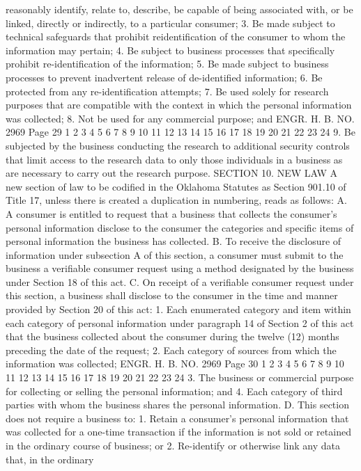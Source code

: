 reasonably identify, relate to, describe, be capable of being
associated with, or be linked, directly or indirectly, to a
particular consumer;
3. Be made subject to technical safeguards that prohibit reidentification of the consumer to whom the information may pertain;
4. Be subject to business processes that specifically prohibit
re-identification of the information;
5. Be made subject to business processes to prevent inadvertent
release of de-identified information;
6. Be protected from any re-identification attempts;
7. Be used solely for research purposes that are compatible
with the context in which the personal information was collected;
8. Not be used for any commercial purpose; and
ENGR. H. B. NO. 2969 Page 29
1
2
3
4
5
6
7
8
9
10
11
12
13
14
15
16
17
18
19
20
21
22
23
24
9. Be subjected by the business conducting the research to
additional security controls that limit access to the research data
to only those individuals in a business as are necessary to carry
out the research purpose.
SECTION 10. NEW LAW A new section of law to be codified
in the Oklahoma Statutes as Section 901.10 of Title 17, unless there
is created a duplication in numbering, reads as follows:
A. A consumer is entitled to request that a business that
collects the consumer's personal information disclose to the
consumer the categories and specific items of personal information
the business has collected.
B. To receive the disclosure of information under subsection A
of this section, a consumer must submit to the business a verifiable
consumer request using a method designated by the business under
Section 18 of this act.
C. On receipt of a verifiable consumer request under this
section, a business shall disclose to the consumer in the time and
manner provided by Section 20 of this act:
1. Each enumerated category and item within each category of
personal information under paragraph 14 of Section 2 of this act
that the business collected about the consumer during the twelve
(12) months preceding the date of the request;
2. Each category of sources from which the information was
collected;
ENGR. H. B. NO. 2969 Page 30
1
2
3
4
5
6
7
8
9
10
11
12
13
14
15
16
17
18
19
20
21
22
23
24
3. The business or commercial purpose for collecting or selling
the personal information; and
4. Each category of third parties with whom the business shares
the personal information.
D. This section does not require a business to:
1. Retain a consumer's personal information that was collected
for a one-time transaction if the information is not sold or
retained in the ordinary course of business; or
2. Re-identify or otherwise link any data that, in the ordinary
